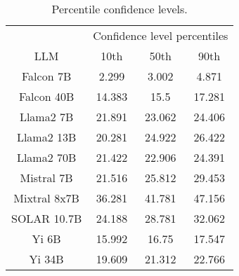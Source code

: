 \begin{table*}
\centering
\begin{tabular}{c|c|c|c}
& \multicolumn{3}{c}{Confidence level percentiles} \\ 
LLM & 10th & 50th & 90th\\ \hline
Falcon 7B & 2.299 & 3.002 & 4.871\\
Falcon 40B & 14.383 & 15.5 & 17.281\\
Llama2 7B & 21.891 & 23.062 & 24.406\\
Llama2 13B & 20.281 & 24.922 & 26.422\\
Llama2 70B & 21.422 & 22.906 & 24.391\\
Mistral 7B & 21.516 & 25.812 & 29.453\\
Mixtral 8x7B & 36.281 & 41.781 & 47.156\\
SOLAR 10.7B & 24.188 & 28.781 & 32.062\\
Yi 6B & 15.992 & 16.75 & 17.547\\
Yi 34B & 19.609 & 21.312 & 22.766\\
\hline
\end{tabular}
\caption{Percentile confidence levels.}
\label{tab:percentile_conf}
\end{table*}
